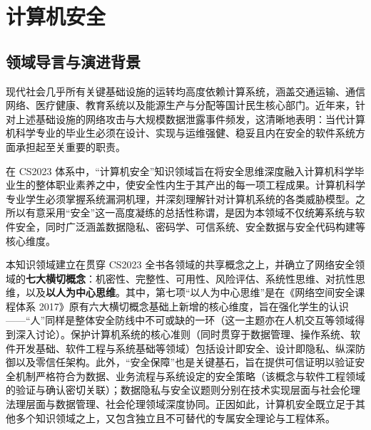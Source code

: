 \chapter{计算机安全}

\section{领域导言与演进背景}

\begin{preamblebox}[知识领域概述与变革]
现代社会几乎所有关键基础设施的运转均高度依赖计算系统，涵盖交通运输、通信网络、医疗健康、教育系统以及能源生产与分配等国计民生核心部门。近年来，针对上述基础设施的网络攻击与大规模数据泄露事件频发，这清晰地表明：当代计算机科学专业的毕业生必须在设计、实现与运维强健、稳妥且内在安全的软件系统方面承担起至关重要的职责。

在 CS2023 体系中，“计算机安全”知识领域旨在将安全思维深度融入计算机科学毕业生的整体职业素养之中，使安全性内生于其产出的每一项工程成果。计算机科学专业学生必须掌握系统漏洞机理，并深刻理解针对计算机系统的各类威胁模型。之所以有意采用“安全”这一高度凝练的总括性称谓，是因为本领域不仅统筹系统与软件安全，同时广泛涵盖数据隐私、密码学、可信系统、安全数据与安全代码构建等核心维度。

本知识领域建立在贯穿 CS2023 全书各领域的共享概念之上，并确立了网络安全领域的\textbf{七大横切概念}：机密性、完整性、可用性、风险评估、系统性思维、对抗性思维，以及\textbf{以人为中心思维}。其中，第七项“以人为中心思维”是在《网络空间安全课程体系 2017》原有六大横切概念基础上新增的核心维度，旨在强化学生的认识——“人”同样是整体安全防线中不可或缺的一环（这一主题亦在人机交互等领域得到深入讨论）。保护计算机系统的核心准则（同时贯穿于数据管理、操作系统、软件开发基础、软件工程与系统基础等领域）包括设计即安全、设计即隐私、纵深防御以及零信任架构。此外，“安全保障”也是关键基石，旨在提供可信证明以验证安全机制严格符合为数据、业务流程与系统设定的安全策略（该概念与软件工程领域的验证与确认密切关联）；数据隐私与安全议题则分别在技术实现层面与社会伦理法理层面与数据管理、社会伦理领域深度协同。正因如此，计算机安全既立足于其他多个知识领域之上，又包含独立且不可替代的专属安全理论与工程体系。


\end{preamblebox}
